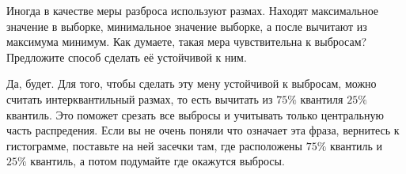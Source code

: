 \documentclass[12pt, a4paper, oneside]{article}
\theoremstyle{plain} %
\theoremstyle{definition}
\begin{document}
\begin{problem}
Иногда в качестве меры разброса используют размах. Находят максимальное значение в выборке, минимальное значение выборке, а после вычитают из максимума минимум. Как думаете, такая мера чувствительна к выбросам? Предложите способ сделать её устойчивой к ним.
\end{problem}

\begin{solution}
Да, будет. Для того, чтобы сделать эту мену устойчивой к выбросам, можно считать интерквантильный размах, то есть вычитать из $75\%$ квантиля $25\%$ квантиль. Это поможет срезать все выбросы и учитывать только центральную часть распредения. Если вы не очень поняли что означает эта фраза, вернитесь к гистограмме, поставьте на ней засечки там, где расположены $75\%$ квантиль и $25\%$ квантиль, а потом подумайте где окажутся выбросы. 
\end{solution}



\end{document}
